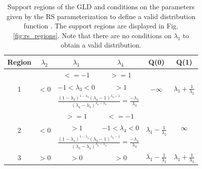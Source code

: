 \begin{table}[]
\centering
\caption{Support regions of the GLD and conditions on the parameters given by the RS parameterization to define a valid distribution function \cite{Karian2011}. The support regions are displayed in Fig. \ref{fig:rs_regions}. Note that there are no conditions on $\lambda_{1}$ to obtain a valid distribution.}
\label{tab:rs_conts}
\begin{tabular}{c|c|c|c|c|c}
\hline
Region             & $\lambda_{2}$         & $\lambda_{3}$      & $\lambda_{4}$      & Q(0)                                                 & Q(1)                                                 \\ \hline
\multirow{3}{*}{1} & \multirow{3}{*}{$<0$} & $<=-1$             & $>=1$              & \multirow{3}{*}{$-\infty$}                           & \multirow{3}{*}{$\lambda_{1}+\frac{1}{\lambda_{2}}$} \\
                   &                       & $-1<\lambda_{3}<0$ & $>1$               &                                                      &                                                      \\
                   &                       & \multicolumn{2}{c|}{$\frac{(1-\lambda_{3})^{1-\lambda_{3}}(\lambda_{4}-1)^{\lambda_{4}-1}}{(\lambda_{4}-\lambda_{3})^{\lambda_{4}-\lambda_{3}}}=\frac{-\lambda_{3}}{\lambda_{3}}$}            &                                                      &                                                      \\ \hline
\multirow{3}{*}{2} & \multirow{3}{*}{$<0$} & $>=1$              & $<=-1$             & \multirow{3}{*}{$\lambda_{1}-\frac{1}{\lambda_{2}}$} &                                                      \\
                   &                       & $>1$               & $-1<\lambda_{4}<0$ &                                                      & $\infty$                                             \\
                   &                       & \multicolumn{2}{c|}{$\frac{(1-\lambda_{4})^{1-\lambda_{4}}(\lambda_{3}-1)^{\lambda_{3}-1}}{(\lambda_{3}-\lambda_{4})^{\lambda_{3}-\lambda_{4}}}=\frac{-\lambda_{4}}{\lambda_{3}}$}            &                                                      &                                                      \\ \hline
\multirow{3}{*}{3} & \multirow{3}{*}{$>0$} & $>0$               & $>0$               & $\lambda_{1}-\frac{1}{\lambda_{2}}$                  & $\lambda_{1}+\frac{1}{\lambda_{2}}$                  \\

\end{tabular}
\end{table}
